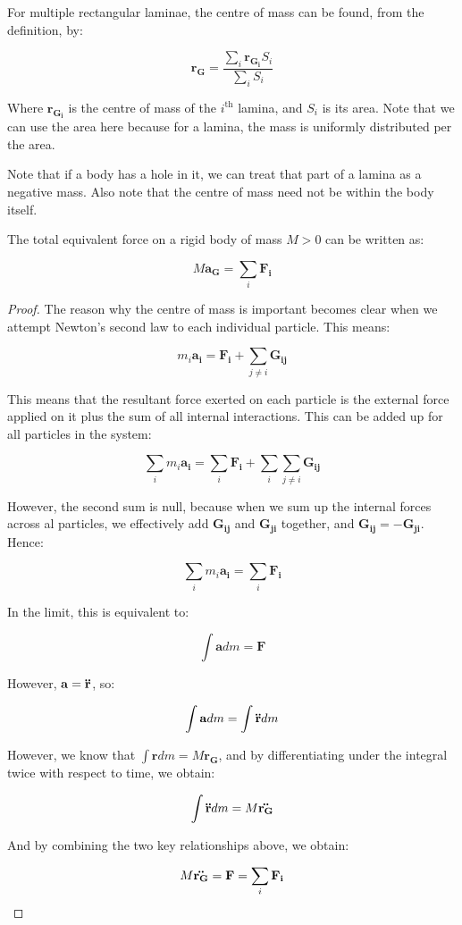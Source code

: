 \documentclass[12pt]{article}
\begin{document}
\begin{proposition}
    For multiple rectangular laminae, the centre of mass can be found, from the definition, by:

    \[ \mathbf{r_G} = \frac{\sum_i \mathbf{r_{G_i}}S_i}{\sum_i S_i} \]

    Where $\mathbf{r_{G_i}}$ is the centre of mass of the $i^{\text{th}}$ lamina, and $S_i$ is its area. Note that we can use the area here because for a lamina, the mass is uniformly distributed per the area.
\end{proposition}

\begin{proposition}[Holes]
    Note that if a body has a hole in it, we can treat that part of a lamina as a negative mass. Also note that the centre of mass need not be within the body itself.
\end{proposition}

\begin{theorem}
    The total equivalent force on a rigid body of mass $M > 0$ can be written as:

    \[ M\mathbf{a_G} = \sum_i \mathbf{F_i} \]
\end{theorem}

\begin{proof}
    The reason why the centre of mass is important becomes clear when we attempt Newton's second law to each individual particle. This means:

    \[ m_i\mathbf{a_i} = \mathbf{F_i} + \sum_{j \neq i}\mathbf{G_{ij}} \]

    This means that the resultant force exerted on each particle is the external force applied on it plus the sum of all internal interactions. This can be added up for all particles in the system:

    \[ \sum_i m_i\mathbf{a_i} = \sum_i \mathbf{F_i} + \sum_i \sum_{j \neq i}\mathbf{G_{ij}} \]

    However, the second sum is null, because when we sum up the internal forces across al particles, we effectively add $\mathbf{G_{ij}}$ and $\mathbf{G_{ji}}$ together, and $\mathbf{G_{ij}} = -\mathbf{G_{ji}}$. Hence:

    \[ \sum_i m_i\mathbf{a_i} = \sum_i \mathbf{F_i} \]

    In the limit, this is equivalent to:

    \[ \int \mathbf{a}dm = \mathbf{F} \]

    However, $\mathbf{a} = \mathbf{\Ddot{r}}$, so:

    \[ \int \mathbf{a}dm = \int \mathbf{\Ddot{r}}dm \]

    However, we know that $\int \mathbf{r}dm = M\mathbf{r_G}$, and by differentiating under the integral twice with respect to time, we obtain:

    \[ \int \mathbf{\Ddot{r}}dm = M\mathbf{\Ddot{r_G}} \]

    And by combining the two key relationships above, we obtain:

    \[ M\mathbf{\Ddot{r_G}} = \mathbf{F} = \sum_i \mathbf{F_i}\]
\end{proof}
\end{document}
